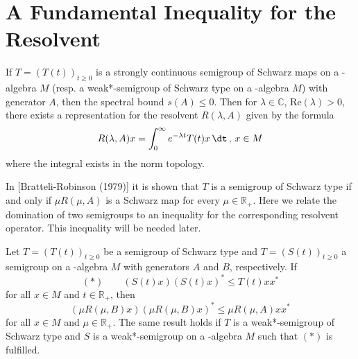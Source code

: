 \section{A Fundamental Inequality for the Resolvent}\label{sec:fundamental}

If $ T = (T(t))_{t \geq 0} $ is a strongly continuous semigroup of Schwarz maps on a \CA-algebra $ M $ (resp. a weak*-semigroup of Schwarz type on a \WA-algebra $ M $) with generator $ A $, then the spectral bound $ s(A) \leq 0 $.
Then for $ \lambda \in \mathbb{C} $, $ \text{Re}(\lambda) > 0 $, there exists a representation for the resolvent $ R(\lambda,A) $ given by the formula
\[
 R(\lambda,A)x = \int_{0}^\infty e^{-\lambda t} T(t)x \, \dt \, , \, x \in M
\]
where the integral exists in the norm topology.



In [Bratteli-Robinson (1979)] it is shown that $ T $ is a semigroup of Schwarz type if and only if $ \mu R(\mu,A) $ is a Schwarz map for every $ \mu \in \mathbb{R}_{+} $.
Here we relate the domination of two semigroups to an inequality for the corresponding resolvent operator.
This inequality will be needed later.

\begin{theorem}\label{thm:2.1}
Let $ T = (T(t))_{t\geq0} $ be a semigroup of Schwarz type and $ T = (S(t))_{t\geq0} $ a semigroup on a \CA-algebra $ M $ with generators $ A $ and $ B $, respectively.
If
\[
(*) \qquad (S(t)x)(S(t)x)^{*} \leq T(t)xx^{*}
\]
for all $ x \in M $ and $ t \in \mathbb{R}_{+} $, then
\[
(\mu R(\mu,B)x)(\mu R(\mu,B)x)^{*} \leq \mu R(\mu,A)xx^{*}
\]
for all $ x \in M $ and $ \mu \in \mathbb{R}_{+} $.
The same result holds if $ T $ is a weak*-semigroup of Schwarz type and $ S $ is a weak*-semigroup on a \WA-algebra $ M $ such that $ (*) $ is fulfilled.
\end{theorem}

